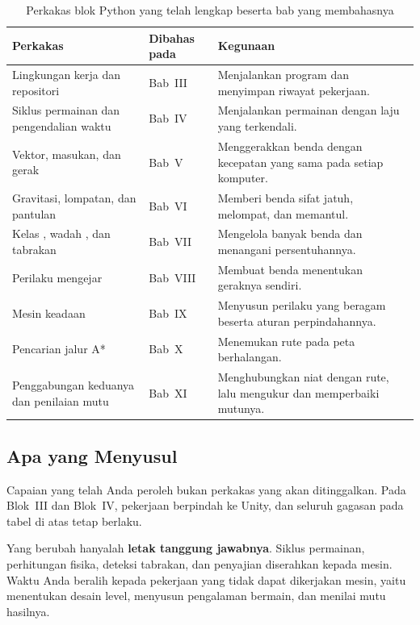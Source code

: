 \begin{table}[htbp]
\centering
\caption{Perkakas blok Python yang telah lengkap beserta bab yang membahasnya}
\label{tab:perkakas-python}
{\setlength{\tabcolsep}{4pt}\footnotesize%
\begin{tabularx}{\textwidth}{@{}L{3.6cm} L{2.6cm} Y@{}}
\toprule
\headrow \textbf{Perkakas} & \textbf{Dibahas pada} & \textbf{Kegunaan} \\
\midrule
Lingkungan kerja dan repositori & Bab~III &
Menjalankan program dan menyimpan riwayat pekerjaan. \\
\addlinespace
Siklus permainan dan pengendalian waktu & Bab~IV &
Menjalankan permainan dengan laju yang terkendali. \\
\addlinespace
Vektor, masukan, dan gerak & Bab~V &
Menggerakkan benda dengan kecepatan yang sama pada setiap komputer. \\
\addlinespace
Gravitasi, lompatan, dan pantulan & Bab~VI &
Memberi benda sifat jatuh, melompat, dan memantul. \\
\addlinespace
Kelas , wadah , dan tabrakan & Bab~VII &
Mengelola banyak benda dan menangani persentuhannya. \\
\addlinespace
Perilaku mengejar & Bab~VIII &
Membuat benda menentukan geraknya sendiri. \\
\addlinespace
Mesin keadaan & Bab~IX &
Menyusun perilaku yang beragam beserta aturan perpindahannya. \\
\addlinespace
Pencarian jalur A* & Bab~X &
Menemukan rute pada peta berhalangan. \\
\addlinespace
Penggabungan keduanya dan penilaian mutu & Bab~XI &
Menghubungkan niat dengan rute, lalu mengukur dan memperbaiki mutunya. \\
\bottomrule
\end{tabularx}}
\end{table}

\subsection{Apa yang Menyusul}

Capaian yang telah Anda peroleh bukan perkakas yang akan ditinggalkan. Pada
Blok~III dan Blok~IV, pekerjaan berpindah ke Unity, dan seluruh gagasan pada
tabel di atas tetap berlaku.

Yang berubah hanyalah \textbf{letak tanggung jawabnya}. Siklus permainan,
perhitungan fisika, deteksi tabrakan, dan penyajian diserahkan kepada mesin.
Waktu Anda beralih kepada pekerjaan yang tidak dapat dikerjakan mesin, yaitu
menentukan desain level, menyusun pengalaman bermain, dan menilai mutu hasilnya.


